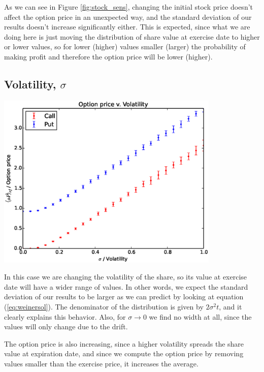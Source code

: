 \documentclass[8 pt]{article}
\newenvironment{Figure}
  {\par\medskip\noindent\minipage{\linewidth}}
  {\endminipage\par\medskip}
\begin{document}
\begin{multicols*}{2}
As we can see in Figure \ref{fig:stock_sens}, changing the initial stock price doesn't affect the option price in an unexpected way, and the standard deviation of our results doesn't increase significantly either. This is expected, since what we are doing here is just moving the distribution of share value at exercise date to higher or lower values, so for lower (higher) values smaller (larger) the probability of making profit and therefore the option price will be lower (higher).

\subsection{Volatility, $\sigma$}

\begin{Figure}
  \begin{center}
    \includegraphics[width=0.8\textwidth]{graphs/oP_vol.eps}
    \label{fig:vol_sens}
  \end{center}
\end{Figure}

In this case we are changing the volatility of the share, so its value at exercise date will have a wider range of values. In other words, we expect the standard deviation of our results to be larger as we can predict by looking at equation (\ref{eq:weinersol}). The denominator of the distribution is given by $2\sigma^2 t$, and it clearly explains this behavior. Also, for $\sigma\rightarrow0$ we find no width at all, since the values will only change due to the drift.

The option price is also increasing, since a higher volatility spreads the share value at expiration date, and since we compute the option price by removing values smaller than the exercise price, it increases the average.


\end{multicols*}
\end{document}
